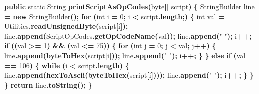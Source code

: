 \documentclass[
  italian,
  openany]{book}
\newenvironment{Shaded}{\begin{snugshade}}{\end{snugshade}}
\newcommand{\BuiltInTok}[1]{#1}
\newcommand{\ControlFlowTok}[1]{\textcolor[rgb]{0.13,0.29,0.53}{\textbf{#1}}}
\newcommand{\DataTypeTok}[1]{\textcolor[rgb]{0.13,0.29,0.53}{#1}}
\newcommand{\DecValTok}[1]{\textcolor[rgb]{0.00,0.00,0.81}{#1}}
\newcommand{\FunctionTok}[1]{\textcolor[rgb]{0.13,0.29,0.53}{\textbf{#1}}}
\newcommand{\KeywordTok}[1]{\textcolor[rgb]{0.13,0.29,0.53}{\textbf{#1}}}
\newcommand{\NormalTok}[1]{#1}
\newcommand{\OperatorTok}[1]{\textcolor[rgb]{0.81,0.36,0.00}{\textbf{#1}}}
\newcommand{\StringTok}[1]{\textcolor[rgb]{0.31,0.60,0.02}{#1}}
\begin{document}
\begin{Shaded}
\begin{Highlighting}[]
\KeywordTok{public} \DataTypeTok{static} \BuiltInTok{String} \FunctionTok{printScriptAsOpCodes}\OperatorTok{(}\DataTypeTok{byte}\OperatorTok{[]}\NormalTok{ script}\OperatorTok{)} \OperatorTok{\{}
    \BuiltInTok{StringBuilder}\NormalTok{ line }\OperatorTok{=} \KeywordTok{new} \BuiltInTok{StringBuilder}\OperatorTok{();}
    \ControlFlowTok{for} \OperatorTok{(}\DataTypeTok{int}\NormalTok{ i }\OperatorTok{=} \DecValTok{0}\OperatorTok{;}\NormalTok{ i }\OperatorTok{\textless{}}\NormalTok{ script}\OperatorTok{.}\FunctionTok{length}\OperatorTok{;)} \OperatorTok{\{}
        \DataTypeTok{int}\NormalTok{ val }\OperatorTok{=} \BuiltInTok{Utilities}\OperatorTok{.}\FunctionTok{readUnsignedByte}\OperatorTok{(}\NormalTok{script}\OperatorTok{[}\NormalTok{i}\OperatorTok{]);}
\NormalTok{        line}\OperatorTok{.}\FunctionTok{append}\OperatorTok{(}\NormalTok{ScriptOpCodes}\OperatorTok{.}\FunctionTok{getOpCodeName}\OperatorTok{(}\NormalTok{val}\OperatorTok{));}
\NormalTok{        line}\OperatorTok{.}\FunctionTok{append}\OperatorTok{(}\StringTok{" "}\OperatorTok{);}
\NormalTok{        i}\OperatorTok{++;}
        \ControlFlowTok{if} \OperatorTok{((}\NormalTok{val }\OperatorTok{\textgreater{}=} \DecValTok{1}\OperatorTok{)} \OperatorTok{\&\&} \OperatorTok{(}\NormalTok{val }\OperatorTok{\textless{}=} \DecValTok{75}\OperatorTok{))} \OperatorTok{\{}
            \ControlFlowTok{for} \OperatorTok{(}\DataTypeTok{int}\NormalTok{ j }\OperatorTok{=} \DecValTok{0}\OperatorTok{;}\NormalTok{ j }\OperatorTok{\textless{}}\NormalTok{ val}\OperatorTok{;}\NormalTok{ j}\OperatorTok{++)} \OperatorTok{\{}
\NormalTok{                line}\OperatorTok{.}\FunctionTok{append}\OperatorTok{(}\FunctionTok{byteToHex}\OperatorTok{(}\NormalTok{script}\OperatorTok{[}\NormalTok{i}\OperatorTok{]));}
\NormalTok{                line}\OperatorTok{.}\FunctionTok{append}\OperatorTok{(}\StringTok{" "}\OperatorTok{);}
\NormalTok{                i}\OperatorTok{++;}
            \OperatorTok{\}}
        \OperatorTok{\}} \ControlFlowTok{else} \ControlFlowTok{if} \OperatorTok{(}\NormalTok{val }\OperatorTok{==} \DecValTok{106}\OperatorTok{)} \OperatorTok{\{}
            \ControlFlowTok{while} \OperatorTok{(}\NormalTok{i }\OperatorTok{\textless{}}\NormalTok{ script}\OperatorTok{.}\FunctionTok{length}\OperatorTok{)} \OperatorTok{\{}
\NormalTok{                line}\OperatorTok{.}\FunctionTok{append}\OperatorTok{(}\FunctionTok{hexToAscii}\OperatorTok{(}\FunctionTok{byteToHex}\OperatorTok{(}\NormalTok{script}\OperatorTok{[}\NormalTok{i}\OperatorTok{])));}
\NormalTok{                line}\OperatorTok{.}\FunctionTok{append}\OperatorTok{(}\StringTok{" "}\OperatorTok{);}
\NormalTok{                i}\OperatorTok{++;}
            \OperatorTok{\}}
        \OperatorTok{\}}
    \OperatorTok{\}}
    \ControlFlowTok{return}\NormalTok{ line}\OperatorTok{.}\FunctionTok{toString}\OperatorTok{();}
\OperatorTok{\}}
\end{Highlighting}
\end{Shaded}
\end{document}
